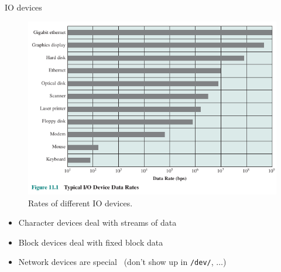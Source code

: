 \documentclass[10pt]{beamer}
\begin{document}
\begin{frame}[allowframebreaks]{IO devices}
\begin{figure}
\begin{center}
       \includegraphics[keepaspectratio, width=\textwidth,height=0.9\textheight-4\baselineskip]{img/208_io_rates.png}
      \end{center}
      \caption{Rates of different IO devices.~\autocite{stallings}}
      \end{figure}
      \framebreak
      \begin{itemize}
       \item Character devices deal with streams of data
       \item Block devices deal with fixed block data
       \item Network devices are special~\autocite{rubini2001linux} (don't show up in \texttt{/dev/}, $\dots$)
      \end{itemize}


\end{frame}
\end{document}
